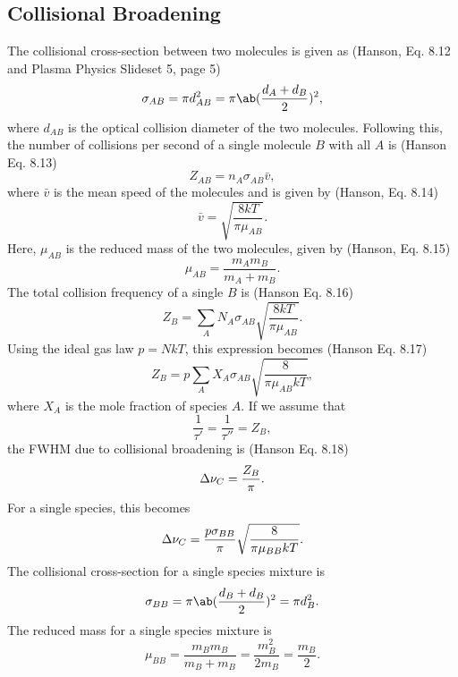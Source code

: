 \documentclass[11pt, twoside, fleqn]{report}
\begin{document}
    \subsection{Collisional Broadening}

    The collisional cross-section between two molecules is given as (Hanson, Eq. 8.12 and Plasma Physics Slideset 5, page 5)
    \begin{equation*}
        \sigma_{AB} = \pi d_{AB}^{2} = \pi\ab(\frac{d_{A} + d_{B}}{2})^{2},
    \end{equation*}
    where $d_{AB}$ is the optical collision diameter of the two molecules. Following this, the number of collisions per second of a single molecule $B$ with all $A$ is (Hanson Eq. 8.13)
    \begin{equation*}
        Z_{AB} = n_{A}\sigma_{AB}\bar{v},
    \end{equation*}
    where $\bar{v}$ is the mean speed of the molecules and is given by (Hanson, Eq. 8.14)
    \begin{equation*}
        \bar{v} = \sqrt{\frac{8kT}{\pi\mu_{AB}}}.
    \end{equation*}
    Here, $\mu_{AB}$ is the reduced mass of the two molecules, given by (Hanson, Eq. 8.15)
    \begin{equation*}
        \mu_{AB} = \frac{m_{A}m_{B}}{m_{A} + m_{B}}.
    \end{equation*}
    The total collision frequency of a single $B$ is (Hanson Eq. 8.16)
    \begin{equation*}
        Z_{B} = \sum_{A}N_{A}\sigma_{AB}\sqrt{\frac{8kT}{\pi\mu_{AB}}}.
    \end{equation*}
    Using the ideal gas law $p = NkT$, this expression becomes (Hanson Eq. 8.17)
    \begin{equation*}
        Z_{B} = p\sum_{A}X_{A}\sigma_{AB}\sqrt{\frac{8}{\pi\mu_{AB}kT}},
    \end{equation*}
    where $X_{A}$ is the mole fraction of species $A$. If we assume that
    \begin{equation*}
        \frac{1}{\tau'} = \frac{1}{\tau''} = Z_{B},
    \end{equation*}
    the FWHM due to collisional broadening is (Hanson Eq. 8.18)
    \begin{equation*}
        \adif{\nu}_{C} = \frac{Z_{B}}{\pi}.
    \end{equation*}
    For a single species, this becomes
    \begin{equation*}
        \adif{\nu}_{C} = \frac{p\sigma_{BB}}{\pi}\sqrt{\frac{8}{\pi\mu_{BB}kT}}.
    \end{equation*}
    The collisional cross-section for a single species mixture is
    \begin{equation*}
        \sigma_{BB} = \pi\ab(\frac{d_{B} + d_{B}}{2})^{2} = \pi d_{B}^{2}.
    \end{equation*}
    The reduced mass for a single species mixture is
    \begin{equation*}
        \mu_{BB} = \frac{m_{B}m_{B}}{m_{B} + m_{B}} = \frac{m_{B}^{2}}{2m_{B}} = \frac{m_{B}}{2}.
    \end{equation*}
\end{document}
